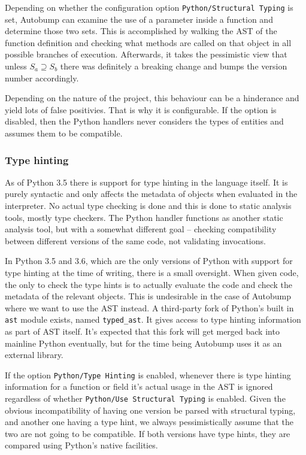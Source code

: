 \documentclass{l4proj}
\newcommand\genericstyle{\lstset{basicstyle=\ttm}}
\newcommand\codeinline[1]{{\genericstyle\lstinline!#1!}}
\begin{document}
Depending on whether the configuration option
\codeinline{Python/Structural Typing} is set, Autobump can examine the use
of a parameter inside a function and determine those two sets. This is
accomplished by walking the AST of the function definition and
checking what methods are called on that object in all possible
branches of execution. Afterwards, it takes the pessimistic view that
unless $S_a \supseteq S_b$ there was definitely a breaking change and
bumps the version number accordingly.

Depending on the nature of the project, this behaviour can be a
hinderance and yield lots of false positivies. That is why it is
configurable. If the option is disabled, then the Python handlers
never considers the types of entities and assumes them to be compatible.

\subsubsection{Type hinting}

As of Python 3.5 there is support for type hinting in the language
itself. It is purely syntactic and only affects the metadata of
objects when evaluated in the interpreter. No actual type checking is
done and this is done to static analysis tools, mostly type checkers.
The Python handler functions as another static analysis tool, but with
a somewhat different goal -- checking compatibility between different
versions of the same code, not validating invocations.

In Python 3.5 and 3.6, which are the only versions of Python with
support for type hinting at the time of writing, there is a small
oversight. When given code, the only to check the type hints is to
actually evaluate the code and check the metadata of the relevant
objects. This is undesirable in the case of Autobump where we want to
use the AST instead. A third-party fork of Python's built in
\codeinline{ast} module exists, named \codeinline{typed_ast}\cite{TypedAST}.
It gives access to type hinting information as part of AST itself.
It's expected that this fork will get merged back into mainline Python
eventually, but for the time being Autobump uses it as an external
library.

If the option \codeinline{Python/Type Hinting} is enabled, whenever there
is type hinting information for a function or field it's actual usage
in the AST is ignored regardless of whether \codeinline{Python/Use
Structural Typing} is enabled. Given the obvious incompatibility of
having one version be parsed with structural typing, and another one
having a type hint, we always pessimistically assume that the two are
not going to be compatible. If both versions have type hints, they are
compared using Python's native facilities.
\end{document}
